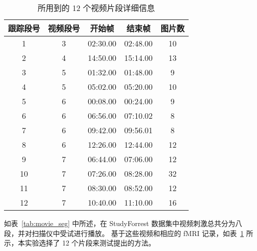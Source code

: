 \vspace{0.6em}
\begin{table}[htbp]\wuhao
	\centering
	\caption{所用到的 12 个视频片段详细信息}
	\vspace{0.3em}
	\begin{tabular} {c|cccc}
		\hline
		跟踪段号  & 视频段号  & 开始帧   & 结束帧 & 图片数 \\ 
		\hline
		1     &3 &02:30.00 &02:48.00 &10  \\
		2   &4 &14:50.00 &15:14.00 &13   \\
		3   &5 &01:32.00 &01:48.00 &9   \\
		4   &5 &05:02.00 &05:20.00 &10   \\
		5   &6 &00:08.00 &00:24.00 &9   \\
		6   &6 &06:56.00 &07:10.02 &8   \\
		7   &6 &09:42.00 &09:56.01 &8   \\
		8   &6 &12:26.00 &12:44.00 &12   \\
		9   &7 &06:44.00 &07:06.00 &12   \\
		10  &7 &07:26.00 &08:28.00 &32   \\
		11  &7 &08:30.00 &08:52.00 &12   \\
		12  &7 &10:40.00 &11:10.00 &16   \\
		\hline
	\end{tabular}
	\label{tab:track_seg}
\end{table}

如表~\ref{tab:movie_seg} 中所述，在 StudyForrest 数据集中视频刺激总共分为八段，并对扫描仪中受试进行播放。
基于这些视频和相应的 fMRI 记录，如表~\ref{tab:track_seg} 所示，本实验选择了 12 个片段来测试提出的方法。

